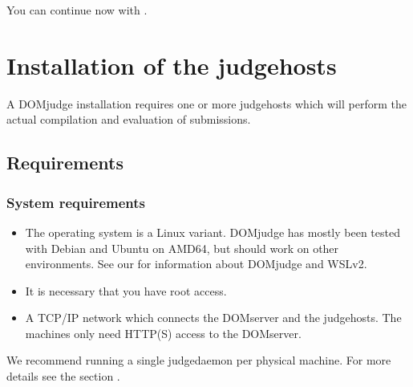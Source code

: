 \documentclass[a4paper,10pt,english,openany]{sphinxmanual}
\begin{document}
\sphinxAtStartPar
You can continue now with
{\hyperref[\detokenize{install-judgehost::doc}]{}}.

\sphinxstepscope


\section{Installation of the judgehosts}
\label{\detokenize{install-judgehost:installation-of-the-judgehosts}}\label{\detokenize{install-judgehost::doc}}
\sphinxAtStartPar
A DOMjudge installation requires one or more judgehosts which will perform
the actual compilation and evaluation of submissions.


\subsection{Requirements}
\label{\detokenize{install-judgehost:requirements}}\label{\detokenize{install-judgehost:judgehost-requirements}}

\subsubsection{System requirements}
\label{\detokenize{install-judgehost:system-requirements}}\begin{itemize}
\item {} 
\sphinxAtStartPar
The operating system is a Linux variant. DOMjudge has mostly
been tested with Debian and Ubuntu on AMD64, but should work on other environments.
See our  for information about DOMjudge and WSLv2.

\item {} 
\sphinxAtStartPar
It is necessary that you have root access.

\item {} 
\sphinxAtStartPar
A TCP/IP network which connects the DOMserver and the judgehosts.
The machines only need HTTP(S) access to the DOMserver.

\end{itemize}

\sphinxAtStartPar
We recommend running a single judgedaemon per physical machine.
For more details see the section {\hyperref[\detokenize{config-advanced:multiple-judgedaemons}]{}}.
\end{document}
